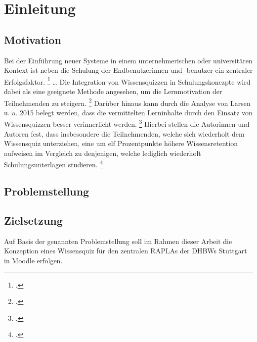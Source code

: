 \chapter{Einleitung}
\section{Motivation}
Bei der Einführung neuer Systeme in einem unternehmerischen oder universitären
Kontext ist neben die Schulung der Endbenutzerinnen und -benutzer ein zentraler Erfolgsfaktor.
\footcite[Vgl.][S. 189 ff.]{leeEmpiricalStudyRelationships1995}
\dots
Die Integration von Wissensquizzen in Schulungskonezpte wird dabei
als eine geeignete Methode angesehen, um die Lernmotivation der Teilnehmenden zu steigern.
\footcites[Vgl.][83]{huangEmpoweringEndUsers1998}[1080]{maurerEQuizSimpleTool2007}[147]{paaERPEndUserTrainingELearning2014}
Darüber hinaus kann durch die Analyse von Larsen u. a. 2015 belegt werden, dass
die vermittelten Lerninhalte durch den Einsatz von Wissensquizzen besser verinnerlicht werden.
\footcite[Vgl.][S. 748 ff.]{larsenEffectsTestenhancedLearning2015}
Hierbei stellen die Autorinnen und Autoren fest, dass insbesondere die Teilnehmenden, welche
sich wiederholt dem Wissensquiz unterziehen, eine um elf Prozentpunkte höhere Wissensretention
aufweisen im Vergleich zu denjenigen, welche lediglich wiederholt Schulungsunterlagen studieren.
\footcite[Vgl.][748]{larsenEffectsTestenhancedLearning2015}
\section{Problemstellung}
\section{Zielsetzung}\label{sec:zielsetzung}
Auf Basis der genannten Problemstellung soll im Rahmen dieser Arbeit
die Konzeption eines Wissensquiz für den zentralen \acp{RAPLA} der \acp{DHBW}
Stuttgart in Moodle erfolgen.
